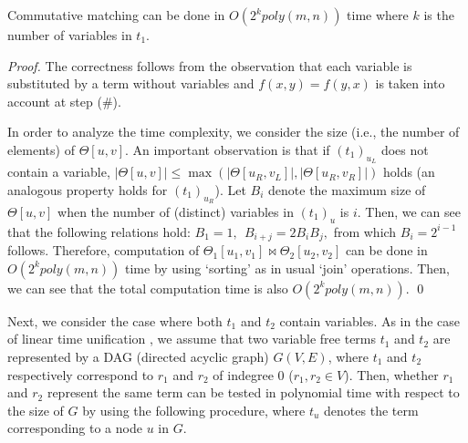 \documentclass[a4paper]{llncs}
\begin{document}
\begin{theorem}
Commutative matching can be done in $O(2^{k} poly(m,n))$ time where
$k$ is the number of variables in $t_1$.
\end{theorem}
\begin{proof}
The correctness follows from the observation that
each variable is substituted by a term without variables and
$f(x,y)=f(y,x)$ is taken into account at step (\#).

In order to analyze the time complexity,
we consider the size (i.e., the number of elements) 
of $\Theta[u,v]$.
An important observation is that
if $(t_1)_{u_L}$ does not
contain a variable,
$|\Theta[u,v]| \leq \max(|\Theta[u_R,v_L]|,|\Theta[u_R,v_R]|)$ holds
(an analogous property holds for $(t_1)_{u_R}$).
Let $B_i$ denote the maximum size of $\Theta[u,v]$ when
the number of (distinct) variables in $(t_1)_u$ is $i$.
Then, we can see that the following relations hold:
$
B_1 = 1,~~B_{i+j} =  2 B_i B_j,
$
from which $B_i = 2^{i-1}$ follows.
Therefore, computation of
$\Theta_1[u_1,v_1] \Join \Theta_2[u_2,v_2]$ can be done in
$O(2^{k} poly(m,n))$ time by using `sorting' as in usual `join' operations.
Then, we can see that the total computation time is also
$O(2^{k} poly(m,n))$.
\qed
\end{proof}

Next, we consider the case where both $t_1$ and $t_2$ contain variables.
As in the case of linear time unification \cite{paterson78},
we assume that two variable free terms $t_1$ and $t_2$
are represented by a DAG (directed acyclic graph) $G(V,E)$,
where $t_1$ and $t_2$ respectively correspond to $r_1$ and $r_2$ 
of indegree 0 ($r_1,r_2 \in V$).
Then, whether $r_1$ and $r_2$ represent the same term can be tested 
in polynomial time with respect to the size of $G$
by using the following procedure, where $t_u$ denotes the term
corresponding to a node $u$ in $G$.
\end{document}
